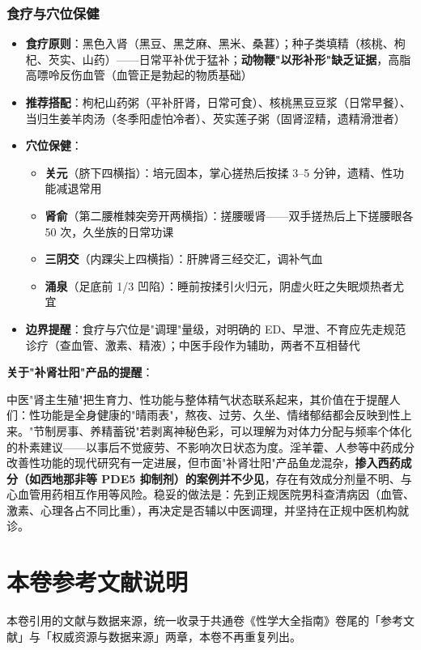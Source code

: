 \documentclass[12pt,a4paper,twoside]{ctexbook}
\begin{document}
\subsection{食疗与穴位保健}


\begin{itemize}
	\item \textbf{食疗原则}：黑色入肾（黑豆、黑芝麻、黑米、桑葚）；种子类填精（核桃、枸杞、芡实、山药）——日常平补优于猛补；\textbf{动物鞭"以形补形"缺乏证据}，高脂高嘌呤反伤血管（血管正是勃起的物质基础）
	\item \textbf{推荐搭配}：枸杞山药粥（平补肝肾，日常可食）、核桃黑豆豆浆（日常早餐）、当归生姜羊肉汤（冬季阳虚怕冷者）、芡实莲子粥（固肾涩精，遗精滑泄者）
	\item \textbf{穴位保健}：
	\begin{itemize}
		\item \textbf{关元}（脐下四横指）：培元固本，掌心搓热后按揉 3--5 分钟，遗精、性功能减退常用
		\item \textbf{肾俞}（第二腰椎棘突旁开两横指）：搓腰暖肾——双手搓热后上下搓腰眼各 50 次，久坐族的日常功课
		\item \textbf{三阴交}（内踝尖上四横指）：肝脾肾三经交汇，调补气血
		\item \textbf{涌泉}（足底前 1/3 凹陷）：睡前按揉引火归元，阴虚火旺之失眠烦热者尤宜
	\end{itemize}
	\item \textbf{边界提醒}：食疗与穴位是"调理"量级，对明确的 ED、早泄、不育应先走规范诊疗（查血管、激素、精液）；中医手段作为辅助，两者不互相替代
\end{itemize}

\vspace{0.5em}
\noindent\textbf{关于"补肾壮阳"产品的提醒}：

中医"肾主生殖"把生育力、性功能与整体精气状态联系起来，其价值在于提醒人们：性功能是全身健康的"晴雨表"，熬夜、过劳、久坐、情绪郁结都会反映到性上来。"节制房事、养精蓄锐"若剥离神秘色彩，可以理解为对体力分配与频率个体化的朴素建议——以事后不觉疲劳、不影响次日状态为度。淫羊藿、人参等中药成分改善性功能的现代研究有一定进展，但市面"补肾壮阳"产品鱼龙混杂，\textbf{掺入西药成分（如西地那非等 PDE5 抑制剂）的案例并不少见}，存在有效成分剂量不明、与心血管用药相互作用等风险。稳妥的做法是：先到正规医院男科查清病因（血管、激素、心理各占不同比重），再决定是否辅以中医调理，并坚持在正规中医机构就诊。


\backmatter

\chapter*{本卷参考文献说明}

本卷引用的文献与数据来源，统一收录于共通卷《性学大全指南》卷尾的「参考文献」与「权威资源与数据来源」两章，本卷不再重复列出。

\printindex
\end{document}
